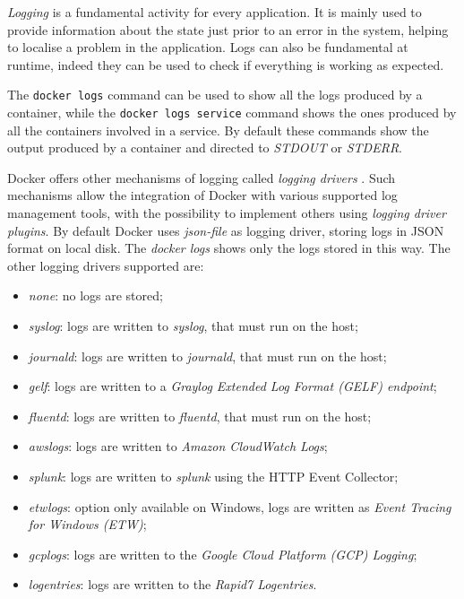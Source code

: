 \documentclass[a4paper,12pt]{article}
\newcommand{\code}[1]{\lstinline|#1|}
\begin{document}
\textit{Logging} is a fundamental activity for every application. It is mainly
used to provide information about the state just prior to an error in the
system, helping to localise a problem in the application. Logs can also be
fundamental at runtime, indeed they can be used to check if everything is
working as expected. \par The \code{docker logs} command can be used to show
all the logs produced by a container, while the \code{docker logs service}
command shows the ones produced by all the containers involved in a service. By
default these commands show the output produced by a container and directed to
\textit{STDOUT} or \textit{STDERR}. \par Docker offers other mechanisms of
logging called \textit{logging drivers} \cite{docker_logging_driver}. Such
mechanisms allow the integration of Docker with various supported log management
tools, with the possibility to implement others using \textit{logging driver
plugins}. By default Docker uses \textit{json-file} as logging driver, storing
logs in JSON format on local disk. The \textit{docker logs} shows only the logs
stored in this way. The other logging drivers supported are: 
\begin{itemize}
  \item \textit{none}: no logs are stored;
  \item \textit{syslog}: logs are written to \textit{syslog}, that must run on
  the host;
  \item \textit{journald}: logs are written to \textit{journald}, that must run on
  the host;
  \item \textit{gelf}: logs are written to a \textit{Graylog Extended Log Format
  (GELF) endpoint};
  \item \textit{fluentd}: logs are written to \textit{fluentd}, that must run on
  the host;
  \item \textit{awslogs}: logs are written to \textit{Amazon CloudWatch Logs};
  \item \textit{splunk}: logs are written to \textit{splunk} using the HTTP
  Event Collector;
  \item \textit{etwlogs}: option only available on Windows, logs are written as
  \textit{Event Tracing for Windows (ETW)};
  \item \textit{gcplogs}: logs are written to the \textit{Google Cloud Platform
  (GCP) Logging};
  \item \textit{logentries}: logs are written to the \textit{Rapid7 Logentries}.
\end{itemize}
\end{document}
